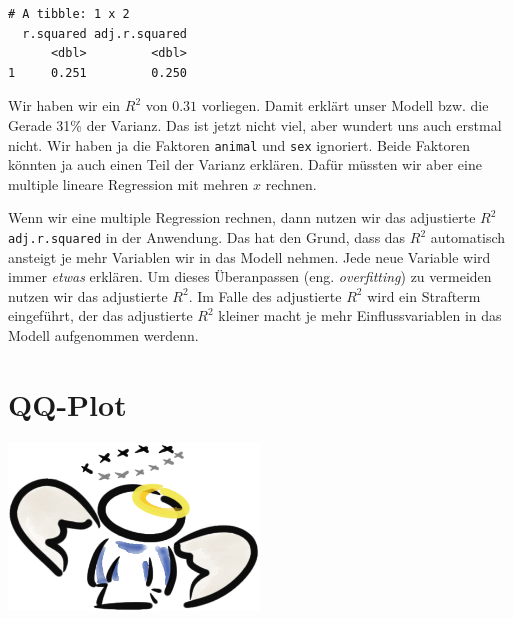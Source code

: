 \documentclass[
  letterpaper,
]{scrbook}
\begin{document}
\begin{verbatim}
# A tibble: 1 x 2
  r.squared adj.r.squared
      <dbl>         <dbl>
1     0.251         0.250
\end{verbatim}

{}

Wir haben wir ein \(R^2\) von \(0.31\) vorliegen. Damit erklärt unser
Modell bzw. die Gerade 31\% der Varianz. Das ist jetzt nicht viel, aber
wundert uns auch erstmal nicht. Wir haben ja die Faktoren
\texttt{animal} und \texttt{sex} ignoriert. Beide Faktoren könnten ja
auch einen Teil der Varianz erklären. Dafür müssten wir aber eine
multiple lineare Regression mit mehren \(x\) rechnen.

Wenn wir eine multiple Regression rechnen, dann nutzen wir das
adjustierte \(R^2\)\texttt{adj.r.squared} in der Anwendung. Das hat den
Grund, dass das \(R^2\) automatisch ansteigt je mehr Variablen wir in
das Modell nehmen. Jede neue Variable wird immer \emph{etwas} erklären.
Um dieses Überanpassen (eng. \emph{overfitting}) zu vermeiden nutzen wir
das adjustierte \(R^2\). Im Falle des adjustierte \(R^2\) wird ein
Strafterm eingeführt, der das adjustierte \(R^2\) kleiner macht je mehr
Einflussvariablen in das Modell aufgenommen werdenn.

\hypertarget{sec-linreg-qq}{%
\section{QQ-Plot}\label{sec-linreg-qq}}

\begin{marginfigure}

{\centering \includegraphics[width=0.5\textwidth,height=\textheight]{./images/angel_01.png}

}

\end{marginfigure}
\end{document}
